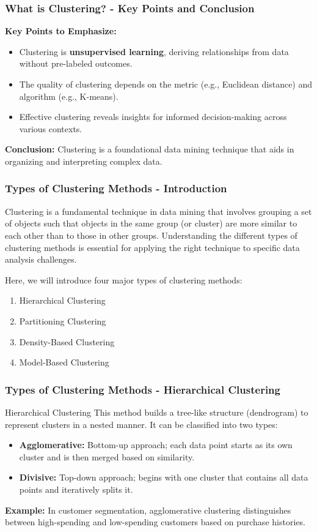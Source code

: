 \documentclass{beamer}
\begin{document}
\begin{frame}[fragile]
    \frametitle{What is Clustering? - Key Points and Conclusion}
    \textbf{Key Points to Emphasize:}
    \begin{itemize}
        \item Clustering is \textbf{unsupervised learning}, deriving relationships from data without pre-labeled outcomes.
        \item The quality of clustering depends on the metric (e.g., Euclidean distance) and algorithm (e.g., K-means).
        \item Effective clustering reveals insights for informed decision-making across various contexts.
    \end{itemize}

    \textbf{Conclusion:} Clustering is a foundational data mining technique that aids in organizing and interpreting complex data.
\end{frame}

\begin{frame}[fragile]
    \frametitle{Types of Clustering Methods - Introduction}
    Clustering is a fundamental technique in data mining that involves grouping a set of objects such that objects in the same group (or cluster) are more similar to each other than to those in other groups. Understanding the different types of clustering methods is essential for applying the right technique to specific data analysis challenges.
    
    Here, we will introduce four major types of clustering methods:
    \begin{enumerate}
        \item Hierarchical Clustering
        \item Partitioning Clustering
        \item Density-Based Clustering
        \item Model-Based Clustering
    \end{enumerate}
\end{frame}

\begin{frame}[fragile]
    \frametitle{Types of Clustering Methods - Hierarchical Clustering}
    \begin{block}{Hierarchical Clustering}
        This method builds a tree-like structure (dendrogram) to represent clusters in a nested manner. It can be classified into two types:
        \begin{itemize}
            \item \textbf{Agglomerative:} Bottom-up approach; each data point starts as its own cluster and is then merged based on similarity.
            \item \textbf{Divisive:} Top-down approach; begins with one cluster that contains all data points and iteratively splits it.
        \end{itemize}
    \end{block}
    \textbf{Example:} In customer segmentation, agglomerative clustering distinguishes between high-spending and low-spending customers based on purchase histories.
\end{frame}
\end{document}

